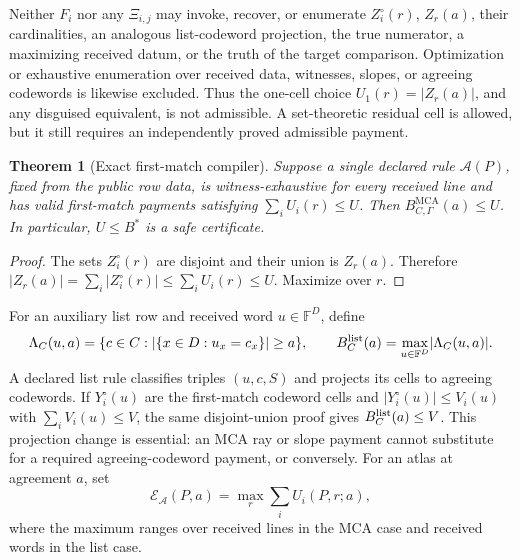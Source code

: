 \documentclass[a4paper,11pt]{amsart}
\newtheorem{theorem}{Theorem}[section]
\theoremstyle{remark}
\DeclareMathOperator{\MCA}{MCA}
\newcommand{\F}{\mathbb F}
\newcommand{\Gam}{\Gamma}
\newcommand{\abs}[1]{\lvert#1\rvert}
\begin{document}
Neither \(F_i\) nor any \(\Xi_{i,j}\) may invoke, recover, or enumerate
\(Z_i^\circ(r)\), \(Z_r(a)\), their cardinalities, an analogous list-codeword
projection, the true numerator, a maximizing received datum, or the truth of
the target comparison.  Optimization or exhaustive enumeration over received
data, witnesses, slopes, or agreeing codewords is likewise excluded.  Thus
the one-cell choice \(U_1(r)=\abs{Z_r(a)}\), and any disguised equivalent, is
not admissible.  A set-theoretic residual cell is allowed, but it still
requires an independently proved admissible payment.

\begin{theorem}[Exact first-match compiler]\label{thm:first-match}
Suppose a single declared rule \(\mathcal A(P)\), fixed from the public row
data, is witness-exhaustive for every received line and has valid first-match
payments satisfying \(\sum_iU_i(r)\le U\).  Then
\(B_{C,\Gam}^{\MCA}(a)\le U\).  In particular, \(U\le B^*\) is a safe
certificate.

\end{theorem}

\begin{proof}
The sets \(Z_i^\circ(r)\) are disjoint and their union is \(Z_r(a)\).
Therefore \(\abs{Z_r(a)}=\sum_i\abs{Z_i^\circ(r)}\le\sum_iU_i(r)\le U\).
Maximize over \(r\).
\end{proof}

For an auxiliary list row and received word \(u\in\F^D\), define
\[
 \Lambda_C(u,a)=\{c\in C:\abs{\{x\in D:u_x=c_x\}}\ge a\},\qquad
 B_C^{\rm list}(a)=\max_{u\in\F^D}\abs{\Lambda_C(u,a)}.
\]
A declared list rule classifies triples \((u,c,S)\) and projects its cells to
agreeing codewords.  If \(Y_i^\circ(u)\) are the first-match codeword cells
and \(\abs{Y_i^\circ(u)}\le V_i(u)\) with \(\sum_iV_i(u)\le V\), the same
disjoint-union proof gives \(B_C^{\rm list}(a)\le V\).  This projection
change is essential: an MCA ray or slope payment cannot substitute for a
required agreeing-codeword payment, or conversely.  For an atlas at agreement
\(a\), set
\[
\mathcal E_{\mathcal A}(P,a)=\max_r\sum_iU_i(P,r;a), \tag{2.7}\label{eq:profile-envelope-value}
\]
where the maximum ranges over received lines in the MCA case and received
words in the list case.
\end{document}
